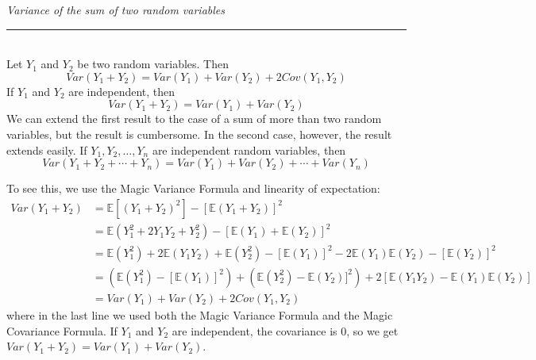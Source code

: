 \documentclass[12pt]{article}
\theoremstyle{definition}
\theoremstyle{remark}
\def\E{{\mathbb E}}
\begin{document}
\begin{framed}
  \emph{Variance of the sum of two random variables}\\
  \rule{\dimexpr{}\fboxrule}{.1pt} \\
Let $Y_1$ and $Y_2$ be two random variables. Then
\[
Var(Y_1 + Y_2) = Var(Y_1) + Var(Y_2) + 2 Cov(Y_1, Y_2)
\]
If $Y_1$ and $Y_2$ are independent, then 
\[
Var(Y_1 + Y_2) = Var(Y_1) + Var(Y_2)
\]
We can extend the first result to the case of a sum of more than two random variables, but the result is cumbersome. In the second case, however, the result extends easily.
If $Y_1, Y_2, \dots, Y_n$ are independent random variables, then 
\[
Var(Y_1 + Y_2 + \cdots + Y_n) = Var(Y_1) + Var(Y_2) + \cdots + Var(Y_n)
\]
\end{framed}
To see this, we use the Magic Variance Formula and linearity of expectation:
\begin{align*}
Var(Y_1 + Y_2) &= \E[(Y_1 + Y_2)^2] - [\E(Y_1 + Y_2)]^2\\
&= \E(Y_1^2 + 2 Y_1 Y_2 + Y_2^2) - [\E(Y_1) + \E(Y_2)]^2 \\
&= \E(Y_1^2) + 2 \E(Y_1 Y_2) + \E(Y_2^2) - [\E(Y_1)]^2 - 2 \E(Y_1)\E(Y_2) - [\E(Y_2)]^2\\
&= (\E(Y_1^2) - [\E(Y_1)]^2) + ( \E(Y_2^2) - \E(Y_2)]^2 ) + 2[\E(Y_1 Y_2) - \E(Y_1)\E(Y_2)]\\
&= Var(Y_1) + Var(Y_2) + 2 Cov(Y_1, Y_2)
\end{align*}
where in the last line we used both the Magic Variance Formula and the Magic Covariance Formula. If $Y_1$ and $Y_2$ are independent, the covariance is 0, so we get $Var(Y_1 + Y_2) = Var(Y_1) + Var(Y_2)$.
\end{document}
